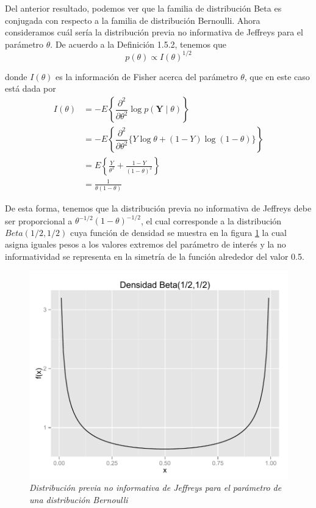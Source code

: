 \documentclass[10pt,openright]{book}\usepackage[]{graphicx}\usepackage[]{color}
\begin{document}
    
    Del anterior resultado, podemos ver que la familia de distribuci\'on Beta es conjugada con respecto a la familia de distribuci\'on Bernoulli. Ahora consideramos cu\'al ser\'ia la distribuci\'on previa no informativa de Jeffreys para el par\'ametro $\theta$. De acuerdo a la Definici\'on 1.5.2, tenemos que
    \begin{equation*}
    p(\theta)\propto I(\theta) ^{1/2}
    \end{equation*}
    
    donde $I(\theta)$ es la informaci\'on de Fisher acerca del par\'ametro $\theta$, que en este caso est\'a dada por
    \begin{align*}
    I(\theta)&=-E\left\{\dfrac{\partial^2}{\partial\theta^2}\log{p(\mathbf{Y}\mid\theta)}\right\}\\
    &=-E\left\{\dfrac{\partial^2}{\partial\theta^2}\{Y\log\theta+(1-Y)\log(1-\theta)\}\right\}\\
    &=E\left\{\frac{Y}{\theta^2}+\frac{1-Y}{(1-\theta)^2}\right\}\\
    &=\frac{1}{\theta(1-\theta)}
    \end{align*}
    
    De esta forma, tenemos que la distribuci\'on previa no informativa de Jeffreys debe ser proporcional a $\theta^{-1/2}(1-\theta)^{-1/2}$, el cual corresponde a la distribuci\'on $Beta(1/2,1/2)$ cuya funci\'on de densidad se muestra en la figura \ref{jefber1} la cual asigna iguales pesos a los valores extremos del par\'ametro de inter\'es y la no informatividad se representa en la simetr\'ia de la funci\'on alrededor del valor 0.5.
    
    \begin{figure}[!htb]\label{jefber1}
    \centering
    \includegraphics[scale=0.5]{Beta_no_inf.pdf}
    \caption{\emph{Distribuci\'on previa no informativa de Jeffreys para el par\'ametro de una distribuci\'on Bernoulli}}
    \end{figure}
    
\end{document}
